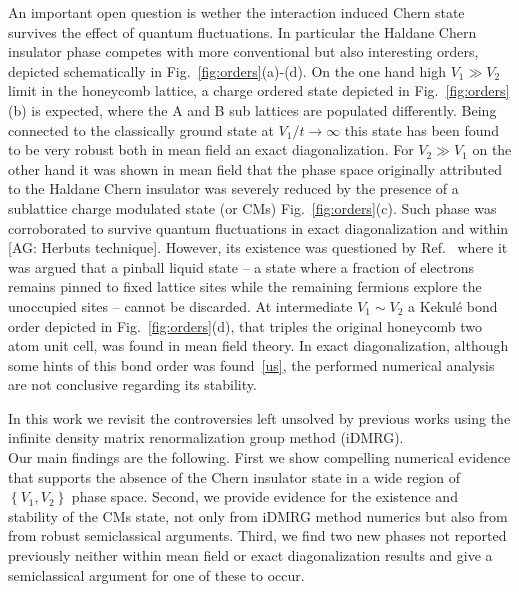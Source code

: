 \documentclass[aps,prx,10pt,twocolumn,floatfix,superscriptaddress,showpacs,numerical,footinbib]{revtex4-1}
\newcommand{\noteAG}[1]{{\color{blue} [AG: #1]}}
\begin{document}
An important open question is wether the interaction induced Chern state survives the effect of quantum fluctuations.
%
In particular the Haldane Chern insulator phase competes with more conventional but also interesting orders, 
depicted schematically in Fig.~\ref{fig:orders}(a)-(d).
%
On the one hand high $V_{1} \gg V_{2}$ limit in the honeycomb lattice, a charge ordered state depicted in Fig.~\ref{fig:orders}(b) is expected, 
where the A and B sub lattices are populated differently.
%
Being connected to the classically ground state at $V_{1}/t \to \infty$ this state has been found to be very robust both in mean field an exact diagonalization.
%
For $V_{2}\gg V_{1}$ on the other hand it was shown in mean field that the phase space originally attributed to the Haldane Chern insulator 
was severely reduced by the presence of a sublattice charge modulated state (or CMs) Fig.~\ref{fig:orders}(c).
%
Such phase was corroborated to survive quantum fluctuations in exact diagonalization \cite{us} and within \noteAG{Herbuts technique}.
%
However, its existence was questioned by Ref.~\cite{} where it was argued that a pinball liquid state -- a state where a fraction of electrons remains pinned to fixed lattice sites while the remaining fermions explore the unoccupied sites -- cannot be discarded. 
%
At intermediate $V_{1}\sim V_{2}$ a Kekul\'e bond order depicted in Fig.~\ref{fig:orders}(d), that triples the original honeycomb two atom unit cell, 
was found in mean field theory.
%
In exact diagonalization, although some hints of this bond order was found~\ref{us}, the performed numerical analysis are not conclusive regarding its stability.
%




%
In this work we revisit the controversies left unsolved by previous works using the infinite density matrix renormalization group method (iDMRG). \\
%
Our main findings are the following. 
%
First we show compelling numerical evidence that supports the absence of the Chern insulator state in a wide region of $\left\lbrace V_{1},V_{2}\right\rbrace$ phase space.
%
Second, we provide evidence for the existence and stability of the CMs state, not only from iDMRG method numerics but also from
from robust semiclassical arguments.
%
Third, we find two new phases not reported previously neither within mean field or exact diagonalization results and give a semiclassical argument for one 
of these to occur.
\end{document}
